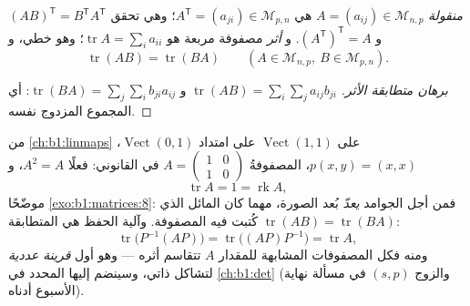 \begin{definition}\label{def:b1:matrices:transpose}
\emph{منقولة} $A = (a_{ij}) \in \mathcal{M}_{n,p}$ هي $A^{\mathsf T}
= (a_{ji}) \in \mathcal{M}_{p,n}$؛ وهي تحقق $(AB)^{\mathsf T} = B^{\mathsf T}
A^{\mathsf T}$ و $(A^{\mathsf T})^{\mathsf T} = A$. و
\emph{أثر} مصفوفة مربعة هو $\operatorname{tr} A
= \sum_i a_{ii}$؛ وهو خطي، و
\[
\operatorname{tr}(AB) = \operatorname{tr}(BA)
\qquad (A \in \mathcal{M}_{n,p},\ B \in \mathcal{M}_{p,n}).
\]
\end{definition}

\begin{proof}[برهان متطابقة الأثر]
$\operatorname{tr}(AB) = \sum_i \sum_j a_{ij} b_{ji}$ و
$\operatorname{tr}(BA) = \sum_j \sum_i b_{ji} a_{ij}$: أي المجموع
المزدوج نفسه.
\end{proof}

\begin{example}
\label{ex:b1:matrices:tracework}
 من \cref{ch:b1:linmaps} على
$\operatorname{Vect}(1,1)$ على امتداد $\operatorname{Vect}(0,1)$،
$p(x, y) = (x, x)$، المصفوفةُ $A = \begin{pmatrix} 1 & 0\\ 1 &
0\end{pmatrix}$ في  القانوني: فعلًا $A^2 = A$، و
\[
\operatorname{tr} A = 1 = \operatorname{rk} A ,
\]
موضّحًا \cref{exo:b1:matrices:8}: فمن أجل الجوامد \emph{يعدّ} 
بُعد الصورة، مهما كان  المائل
الذي كُتبت فيه المصفوفة. وآلية الحفظ هي
المتطابقة $\operatorname{tr}(AB) = \operatorname{tr}(BA)$:
\[
\operatorname{tr}\bigl(P^{-1}(AP)\bigr) =
\operatorname{tr}\bigl((AP)P^{-1}\bigr) = \operatorname{tr} A ,
\]
ومنه فكل المصفوفات المشابهة للمقدار $A$ تتقاسم أثره --- وهو أول
\emph{قرينة عددية} لتشاكل ذاتي، وسينضم إليها
المحدد في \cref{ch:b1:det} (والزوج $(s, p)$ في
مسألة نهاية الأسبوع أدناه).
\end{example}

